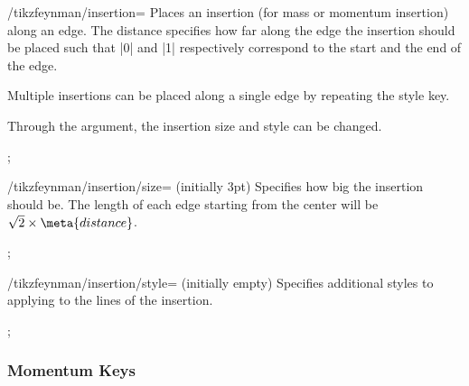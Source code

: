 \documentclass[a4paper,final]{ltxdoc}
\begin{document}
\begin{codeexample}[execute code=false]
\begin{key}{/tikzfeynman/insertion=}
  Places an insertion (for mass or momentum insertion) along an edge.  The
  distance specifies how far along the edge the insertion should be placed such
  that |0| and |1| respectively correspond to the start and the end of the edge.

  Multiple insertions can be placed along a single edge by repeating the style
  key.

  Through the  argument, the insertion size and style can be
  changed.

\begin{codeexample}[]
;
\end{codeexample}

  \begin{key}{/tikzfeynman/insertion/size= (initially 3pt)}
    Specifies how big the insertion should be.  The length of each edge starting
    from the center will be \(\sqrt{2} \times \meta{distance}\).

\begin{codeexample}[]
;
\end{codeexample}
  \end{key}

  \begin{key}{/tikzfeynman/insertion/style= (initially \normalfont empty)}
    Specifies additional styles to applying to the lines of the insertion.

\begin{codeexample}[]
;
\end{codeexample}
  \end{key}
\end{key}

\subsubsection{Momentum Keys}
\label{subsubsec:momentum_keys}


\end{codeexample}
\end{document}
